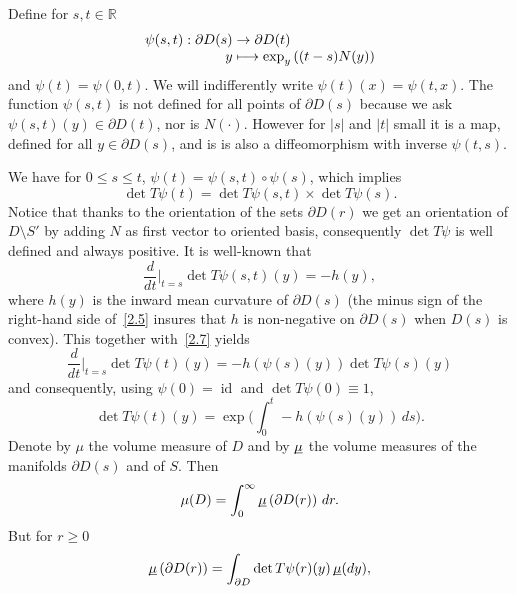 \documentclass[10pt]{amsart}
\let\backslash\setminus
\newcommand\mto{\mathchoice{\longmapsto}{\mapsto}{\mapsto}{\mapsto}}
\theoremstyle{plain}
\theoremstyle{definition}
\newcommand{\RR}{{\mathbb R}}
\newcommand{\usm}{{\underline{\smash{\mu}}}}
\DeclareMathOperator{\id}{id}
\let\f\frac
\let\pa\partial
\begin{document}
Define for $s, t\in \RR$\vspace*{-3pt}
\begin{equation}
\label{2.4}
\begin{split}
\psi(s,t): \partial D(s)&\to \partial D(t)\\[-3pt]
y&\mto \exp_y\left((t-s)N(y)\right)
\end{split}
\end{equation}
and $\psi(t)=\psi(0,t)$. We will indifferently write $\psi(t)(x)=\psi(t,x)$.
The function $\psi(s,t)$ is not defined for all points of $\partial D(s)$ because we ask $\psi(s,t)(y)\in \partial D(t)$,
nor is $N(\cdot)$. However for $|s|$ and $|t|$ small it is a map, defined for all $y\in\partial D(s)$, and is is also a diffeomorphism with inverse $\psi(t,s)$.

We have for $0\le s\le t$,
$
\psi(t)=\psi(s,t)\circ\psi(s)$, which implies \begin{equation}\label{2.7}\det T\psi(t)=\det T\psi(s,t)\times \det T\psi(s).\end{equation}
Notice that thanks to the orientation of the sets $\partial D(r)$ we get an orientation of $D\backslash S'$ by adding $N$ as first vector to oriented basis, consequently $\det T\psi$ is well defined and always positive.
{It is well-known} that
\begin{equation}
\label{2.5}
\f{d}{dt}\Big|_{t=s}\det T\psi(s,t)(y)=-h(y),
\end{equation}
where $h(y)$ is the inward mean curvature of $\partial D(s)$
(the minus sign of the right-hand side of~\eqref{2.5} insures that $h$ is non-negative on $\pa D(s)$ when $D(s)$ is convex). This together with~\eqref{2.7} yields
\begin{equation}
\f{d}{dt}{\Big|_{t=s}}\det T\psi(t)(y)=-h\left(\psi(s)(y)\right)\det T\psi(s)(y)
\end{equation}
and consequently, using $\psi(0)=\id$ and $\det T\psi(0)\equiv 1$,
\begin{equation}
\det T\psi(t)(y)=\exp\biggl(\int_0^t -h\left(\psi(s)(y)\right)\,ds\biggr).
\end{equation}
Denote by $\mu$ the volume measure of $D$ and by $\usm$ the volume measures of the manifolds $\partial D(s)$ and of $S$.
Then
\begin{equation}
\label{2.9}
\mu(D)=\int_0^\infty \usm\left(\partial D(r)\right)\, dr.
\end{equation}
But for $r\ge 0$
\begin{equation}
\usm\left(\partial D(r)\right)=\int_{\partial D}\det T\psi(r)(y)\,\usm(dy),
\end{equation}
\end{document}
